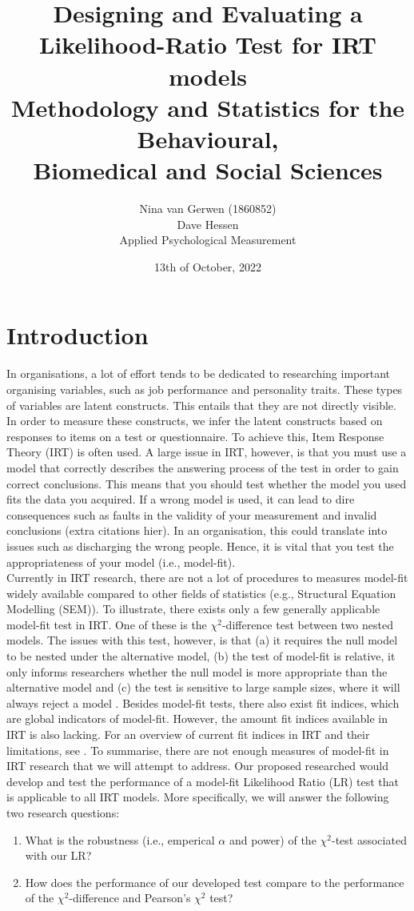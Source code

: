 \documentclass{article}
\title{%
	Designing and Evaluating a Likelihood-Ratio Test for IRT models \\
	\large Methodology and Statistics for the Behavioural, \\
	Biomedical and Social Sciences}
\author{Nina van Gerwen (1860852) \\
	Dave Hessen \\
	\small Applied Psychological Measurement}
\date{13th of October, 2022}
\begin{document}
\maketitle

\newpage

\part{Introduction}
In organisations, a lot of effort tends to be dedicated to researching important organising variables, such as job performance and personality traits. These types of variables are latent constructs. This entails that they are not directly visible. In order to measure these constructs, we infer the latent constructs based on responses to items on a test or questionnaire. To achieve this, Item Response Theory (IRT) is often used. A large issue in IRT, however, is that you must use a model that correctly describes the answering process of the test in order to gain correct conclusions. This means that you should test whether the model you used fits the data you acquired. If a wrong model is used, it can lead to dire consequences such as faults in the validity of your measurement \autocite{consq1} and invalid conclusions (extra citations hier). In an organisation, this could translate into issues such as discharging the wrong people. Hence, it is vital that you test the appropriateness of your model (i.e., model-fit). \\
\indent Currently in IRT research, there are not a lot of procedures to measures model-fit widely available compared to other fields of statistics (e.g., Structural Equation Modelling (SEM)). To illustrate, there exists only a few generally applicable model-fit test in IRT. One of these is the $\chi^2$-difference test between two nested models. The issues with this test, however, is that (a) it requires the null model to be nested under the alternative model, (b) the test of model-fit is relative, it only informs researchers whether the null model is more appropriate than the alternative model and (c) the test is sensitive to large sample sizes, where it will always reject a model \autocite{chi2sens}. Besides model-fit tests, there also exist fit indices, which are global indicators of model-fit. However, the amount fit indices available in IRT is also lacking. For an overview of current fit indices in IRT and their limitations, see \textcite{ref1}. To summarise, there are not enough measures of model-fit in IRT research that we will attempt to address.
\indent Our proposed researched would develop and test the performance of a model-fit Likelihood Ratio (LR) test that is applicable to all IRT models. More specifically, we will answer the following two research questions:
\begin{enumerate}
\item What is the robustness (i.e., emperical $\alpha$ and power) of the $\chi^2$-test associated with our LR?
\item How does the performance of our developed test compare to the performance of the $\chi^2$-difference and Pearson's $\chi^2$ test?
\end{enumerate}
\end{document}
